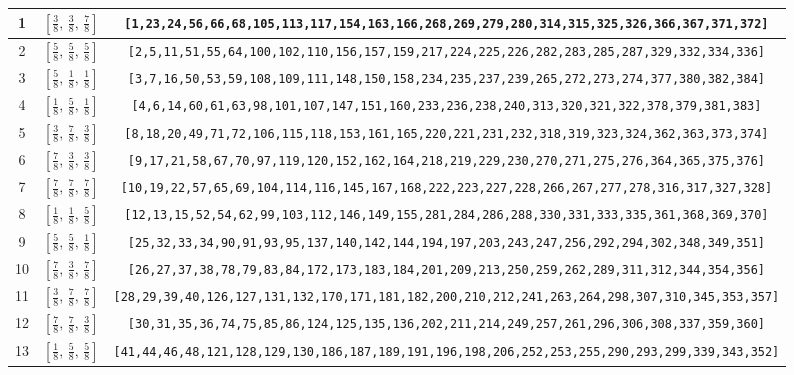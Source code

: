 \documentclass[fleqn,8pt]{jsarticle}
\begin{document}
\begin{longtable}{ccc}
1 & $\left[ \frac{3}{8},\, \frac{3}{8},\, \frac{7}{8} \right]$ & {\tt [1,23,24,56,66,68,105,113,117,154,163,166,268,269,279,280,314,315,325,326,366,367,371,372]} \\ \hline
2 & $\left[ \frac{5}{8},\, \frac{5}{8},\, \frac{5}{8} \right]$ & {\tt [2,5,11,51,55,64,100,102,110,156,157,159,217,224,225,226,282,283,285,287,329,332,334,336]} \\ \hline
3 & $\left[ \frac{5}{8},\, \frac{1}{8},\, \frac{1}{8} \right]$ & {\tt [3,7,16,50,53,59,108,109,111,148,150,158,234,235,237,239,265,272,273,274,377,380,382,384]} \\ \hline
4 & $\left[ \frac{1}{8},\, \frac{5}{8},\, \frac{1}{8} \right]$ & {\tt [4,6,14,60,61,63,98,101,107,147,151,160,233,236,238,240,313,320,321,322,378,379,381,383]} \\ \hline
5 & $\left[ \frac{3}{8},\, \frac{7}{8},\, \frac{3}{8} \right]$ & {\tt [8,18,20,49,71,72,106,115,118,153,161,165,220,221,231,232,318,319,323,324,362,363,373,374]} \\ \hline
6 & $\left[ \frac{7}{8},\, \frac{3}{8},\, \frac{3}{8} \right]$ & {\tt [9,17,21,58,67,70,97,119,120,152,162,164,218,219,229,230,270,271,275,276,364,365,375,376]} \\ \hline
7 & $\left[ \frac{7}{8},\, \frac{7}{8},\, \frac{7}{8} \right]$ & {\tt [10,19,22,57,65,69,104,114,116,145,167,168,222,223,227,228,266,267,277,278,316,317,327,328]} \\ \hline
8 & $\left[ \frac{1}{8},\, \frac{1}{8},\, \frac{5}{8} \right]$ & {\tt [12,13,15,52,54,62,99,103,112,146,149,155,281,284,286,288,330,331,333,335,361,368,369,370]} \\ \hline
9 & $\left[ \frac{5}{8},\, \frac{5}{8},\, \frac{1}{8} \right]$ & {\tt [25,32,33,34,90,91,93,95,137,140,142,144,194,197,203,243,247,256,292,294,302,348,349,351]} \\ \hline
10 & $\left[ \frac{7}{8},\, \frac{3}{8},\, \frac{7}{8} \right]$ & {\tt [26,27,37,38,78,79,83,84,172,173,183,184,201,209,213,250,259,262,289,311,312,344,354,356]} \\ \hline
11 & $\left[ \frac{3}{8},\, \frac{7}{8},\, \frac{7}{8} \right]$ & {\tt [28,29,39,40,126,127,131,132,170,171,181,182,200,210,212,241,263,264,298,307,310,345,353,357]} \\ \hline
12 & $\left[ \frac{7}{8},\, \frac{7}{8},\, \frac{3}{8} \right]$ & {\tt [30,31,35,36,74,75,85,86,124,125,135,136,202,211,214,249,257,261,296,306,308,337,359,360]} \\ \hline
13 & $\left[ \frac{1}{8},\, \frac{5}{8},\, \frac{5}{8} \right]$ & {\tt [41,44,46,48,121,128,129,130,186,187,189,191,196,198,206,252,253,255,290,293,299,339,343,352]} \\ \hline

\end{longtable}
\end{document}
